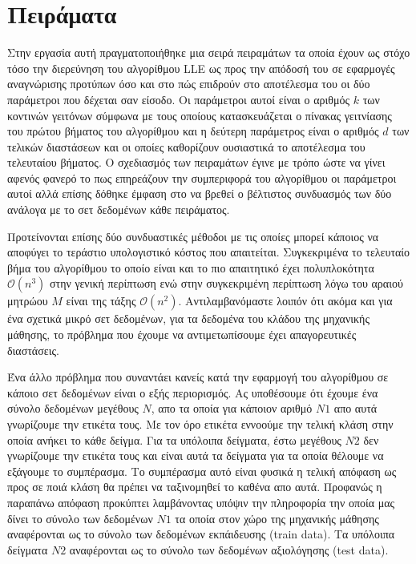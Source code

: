 
\chapter{Πειράματα}
\par
Στην εργασία αυτή πραγματοποιήθηκε μια σειρά πειραμάτων τα οποία έχουν ως στόχο τόσο την διερεύνηση του αλγορίθμου \textlatin{LLE} ως προς την απόδοσή του σε εφαρμογές αναγνώρισης προτύπων όσο και στο πώς επιδρούν στο αποτέλεσμα του οι δύο παράμετροι που δέχεται σαν είσοδο. Οι παράμετροι αυτοί είναι ο αριθμός $k$ των κοντινών γειτόνων σύμφωνα με τους οποίους κατασκευάζεται ο πίνακας γειτνίασης του πρώτου βήματος του αλγορίθμου και η δεύτερη παράμετρος είναι ο αριθμός $d$ των τελικών διαστάσεων και οι οποίες καθορίζουν ουσιαστικά το αποτέλεσμα του τελευταίου βήματος. Ο σχεδιασμός των πειραμάτων έγινε με τρόπο ώστε να γίνει αφενός φανερό το πως επηρεάζουν την συμπεριφορά του αλγορίθμου οι παράμετροι αυτοί αλλά επίσης δόθηκε έμφαση στο να βρεθεί ο βέλτιστος συνδυασμός των δύο ανάλογα με το σετ δεδομένων κάθε πειράματος. 
\par
Προτείνονται επίσης δύο συνδυαστικές μέθοδοι με τις οποίες μπορεί κάποιος να αποφύγει το τεράστιο υπολογιστικό κόστος που απαιτείται. Συγκεκριμένα το τελευταίο βήμα του αλγορίθμου το οποίο είναι και το πιο απαιτητικό έχει πολυπλοκότητα $\mathcal{O}(n^{3})$ στην γενική περίπτωση ενώ στην συγκεκριμένη περίπτωση λόγω του αραιού μητρώου $M$ είναι της τάξης $\mathcal{O}(n^{2})$. Αντιλαμβανόμαστε λοιπόν ότι ακόμα και για ένα σχετικά μικρό σετ δεδομένων, για τα δεδομένα του κλάδου της μηχανικής μάθησης, το πρόβλημα που έχουμε να αντιμετωπίσουμε έχει απαγορευτικές διαστάσεις. 
\par
Ένα άλλο πρόβλημα που συναντάει κανείς κατά την εφαρμογή του αλγορίθμου σε κάποιο σετ δεδομένων είναι ο εξής περιορισμός. Ας υποθέσουμε ότι έχουμε ένα σύνολο δεδομένων μεγέθους $N$, απο τα οποία για κάποιον αριθμό $N1$ απο αυτά γνωρίζουμε την ετικέτα τους. Με τον όρο ετικέτα εννοούμε την τελική κλάση στην οποία ανήκει το κάθε δείγμα. Για τα υπόλοιπα δείγματα, έστω μεγέθους $N2$ δεν γνωρίζουμε την ετικέτα τους και είναι αυτά τα δείγματα για τα οποία θέλουμε να εξάγουμε το συμπέρασμα. Το συμπέρασμα αυτό είναι φυσικά η τελική απόφαση ως προς σε ποιά κλάση θα πρέπει να ταξινομηθεί το καθένα απο αυτά. Προφανώς η παραπάνω απόφαση προκύπτει λαμβάνοντας υπόψιν την πληροφορία την οποία μας δίνει το σύνολο των δεδομένων $N1$ τα οποία στον χώρο της μηχανικής μάθησης αναφέρονται ως το σύνολο των δεδομένων εκπάιδευσης \textlatin{(train data)}. Τα υπόλοιπα δείγματα $N2$ αναφέρονται ως το σύνολο των δεδομένων αξιολόγησης \textlatin{(test data)}.
